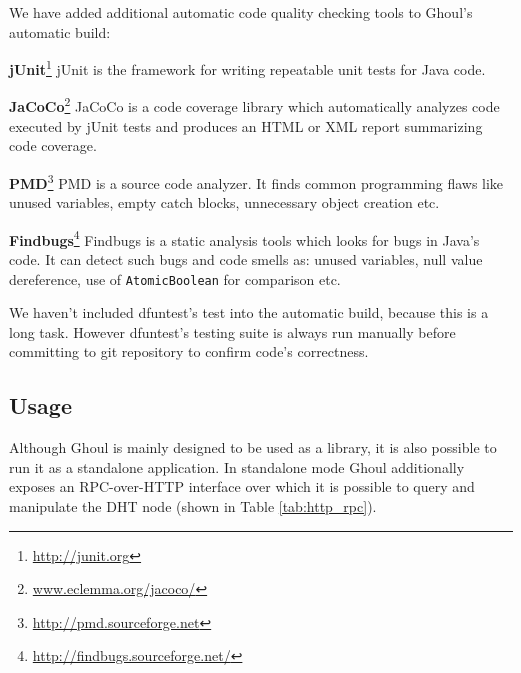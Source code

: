 We have added additional automatic code quality checking tools to Ghoul's automatic build:

\begin{description}
  \item{\textbf{jUnit}\footnote{\url{http://junit.org}}} 
    jUnit is the framework for writing repeatable unit tests for Java code.
  \item{\textbf{JaCoCo}\footnote{\url{www.eclemma.org/jacoco/}}}
    JaCoCo is a code coverage library which automatically analyzes code executed by jUnit tests and produces an HTML or XML report summarizing code coverage.

  \item{\textbf{PMD}\footnote{\url{http://pmd.sourceforge.net}}}
    PMD is a source code analyzer.
    It finds common programming flaws like unused variables, empty catch blocks, unnecessary object creation etc.
  \item{\textbf{Findbugs}\footnote{\url{http://findbugs.sourceforge.net/}}}
    Findbugs is a static analysis tools which looks for bugs in Java's code.
    It can detect such bugs and code smells as: unused variables, null value
    dereference, use of \texttt{AtomicBoolean} for comparison etc.
    
\end{description}

We haven't included dfuntest's test into the automatic build, because this is a
long task.
However dfuntest's testing suite is always run manually before committing to git
repository to confirm code's correctness.

\subsection{Usage}

Although Ghoul is mainly designed to be used as a library, it is also possible
to run it as a standalone application.
In standalone mode Ghoul additionally exposes an RPC-over-HTTP interface over
which it is possible to query and manipulate the DHT node (shown in Table
\ref{tab:http_rpc}).

